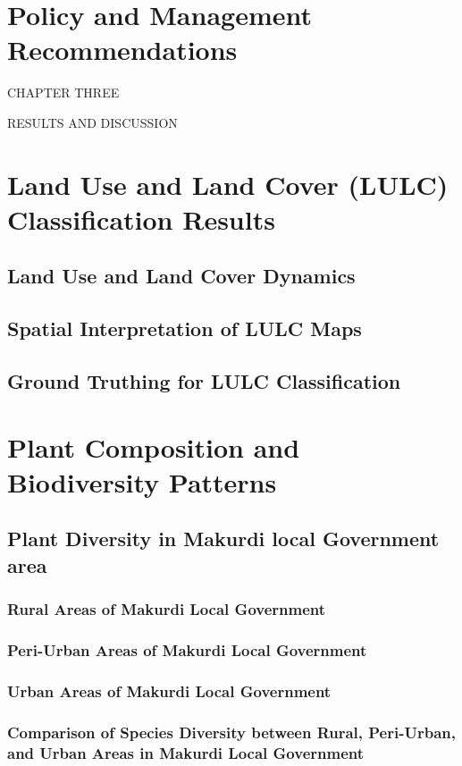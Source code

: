 \section{Policy and Management Recommendations}
\label{section:2-7}

CHAPTER THREE 

RESULTS AND DISCUSSION 
\section{Land Use and Land Cover (LULC) Classification Results}
\label{section:3-1}
\subsection{Land Use and Land Cover Dynamics}
\label{subsection:3-1-1}
\subsection{Spatial Interpretation of LULC Maps}
\label{subsection:3-1-2}
\subsection{Ground Truthing for LULC Classification}
\label{subsection:3-1-3}
\section{Plant Composition and Biodiversity Patterns}
\label{section:3-2}
\subsection{Plant Diversity in Makurdi local Government area}
\label{subsection:3-2-1}
\subsubsection{Rural Areas of Makurdi Local Government}
\label{subsubsection:3-2-1-1}
\subsubsection{Peri-Urban Areas of Makurdi Local Government}
\label{subsubsection:3-2-1-2}
\subsubsection{Urban Areas of Makurdi Local Government}
\label{subsubsection:3-2-1-3}
\subsubsection{Comparison of Species Diversity between Rural, Peri-Urban, and Urban Areas in Makurdi Local Government}
\label{subsubsection:3-2-1-4}
